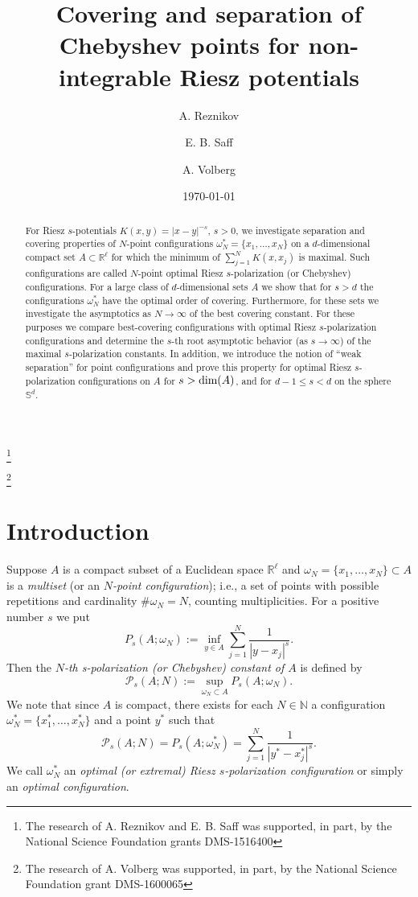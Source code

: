\documentclass[12pt]{amsart}
\title[Covering and separation properties of Chebyshev points]{Covering and separation of Chebyshev points for non-integrable Riesz potentials}
\date{\today}
\theoremstyle{definition}
\def\sli{\sum\limits}
\def\R{\mathbb{R}}
\newcommand{\1}{\mathbf{1}}
\newcommand{\PP}{\mathcal{P}}
\begin{document}
\author{A. Reznikov}
\address{Center for Constructive Approximation, Department of Mathematics, Vanderbilt University}
\author{E. B. Saff}
\thanks{The research of A. Reznikov and E. B. Saff was supported, in part, by the National Science Foundation grants DMS-1516400}
\author{A. Volberg}
\address{Department of Mathematics, Michigan State University}
\thanks{The research of A. Volberg was supported, in part, by the National Science Foundation grant DMS-1600065}
\begin{abstract}
For Riesz $s$-potentials $K(x,y)=|x-y|^{-s}$, $s>0$, we investigate separation and covering properties of $N$-point configurations $\omega^*_N=\{x_1, \ldots, x_N\}$ on a $d$-dimensional compact set $A\subset \R^\ell$ for which the minimum of $\sum_{j=1}^N K(x, x_j)$ is maximal. Such configurations are called $N$-point optimal Riesz $s$-polarization (or Chebyshev) configurations. For a large class of $d$-dimensional sets $A$ we show that for $s>d$ the configurations $\omega^*_N$ have the optimal order of covering. Furthermore, for these sets we investigate the asymptotics as $N\to \infty$ of the best covering constant. For these purposes we compare best-covering configurations with optimal Riesz $s$-polarization configurations and determine the $s$-th root asymptotic behavior (as $s\to \infty$) of the maximal $s$-polarization constants. In addition, we introduce the notion of ``weak separation'' for point configurations and prove this property for optimal Riesz $s$-polarization configurations on $A$ for $s>\textup{dim}(A)$, and for $d-1\leqslant s < d$ on the sphere $\mathbb{S}^d$.
\end{abstract}
\maketitle

\section{Introduction}
Suppose $A$ is a compact subset of a Euclidean space $\R^\ell$ and $\omega_N=\{x_1, \ldots, x_N\}\subset A$ is a {\it multiset} (or an {\it $N$-point configuration}); i.e., a set of points with possible repetitions and cardinality $\# \omega_N = N$, counting multiplicities. For a positive number $s$ we put
$$
P_s(A;\omega_N):=\inf_{y\in A} \sum_{j=1}^N \frac{1}{|y-x_j|^s}.
$$
Then the {\it $N$-th s-polarization (or Chebyshev) constant of $A$} is defined by
$$
\PP_{s}(A;N):=\sup_{\omega_N\subset A} P_s(A;\omega_N).
$$
We note that since $A$ is compact, there exists for each $N\in \mathbb{N}$ a configuration $\omega_N^*=\{x_1^*, \ldots, x_N^*\}$ and a point $y^*$ such that
\begin{equation}\label{optconfig}
\PP_s(A;N)=P_s(A;\omega_N^*) = \sli_{j=1}^N \frac{1}{|y^*-x_j^*|^s}. 
\end{equation}
We call $\omega_N^*$ an {\it optimal (or extremal) Riesz $s$-polarization configuration} or simply an {\it optimal configuration}.
\end{document}
